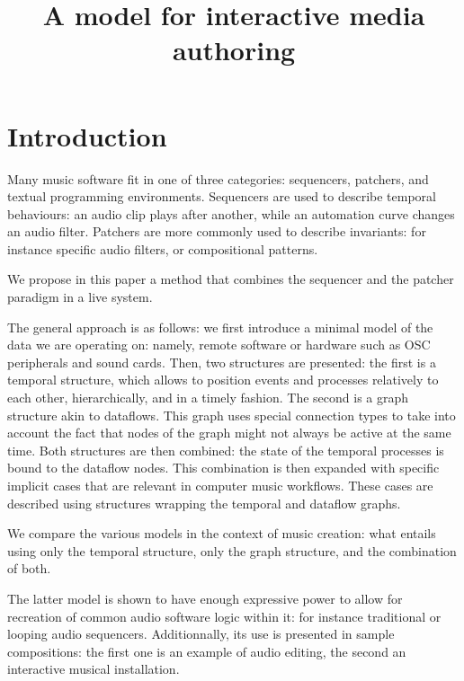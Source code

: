 \documentclass{article}
\title{A model for interactive media authoring}
\begin{document}
\section{Introduction}
Many music software fit in one of three categories: sequencers, patchers, and textual programming environments. Sequencers are used to describe temporal behaviours: an audio clip plays after another, while an automation curve changes an audio filter. Patchers are more commonly used to describe invariants: for instance specific audio filters, or compositional patterns. 

We propose in this paper a method that combines the sequencer and the patcher paradigm in a live system.  

The general approach is as follows: we first introduce a minimal model of the data we are operating on: namely, remote software or hardware such as OSC peripherals and sound cards. Then, two structures are presented: the first is a temporal structure, which allows to position events and processes relatively to each other, hierarchically, and in a timely fashion. The second is a graph structure akin to dataflows. This graph uses special connection types to take into account the fact that nodes of the graph might not always be active at the same time. Both structures are then combined: the state of the temporal processes is bound to the dataflow nodes. This combination is then expanded with specific implicit cases that are relevant in computer music workflows. These cases are described using structures wrapping the temporal and dataflow graphs. 

We compare the various models in the context of music creation: what entails using only the temporal structure, only the graph structure, and the combination of both. 

The latter model is shown to have enough expressive power to allow for recreation of common audio software logic within it: for instance traditional or looping audio sequencers. Additionnally, its use is presented in sample compositions: the first one is an example of audio editing, the second an interactive musical installation.



\end{document}

